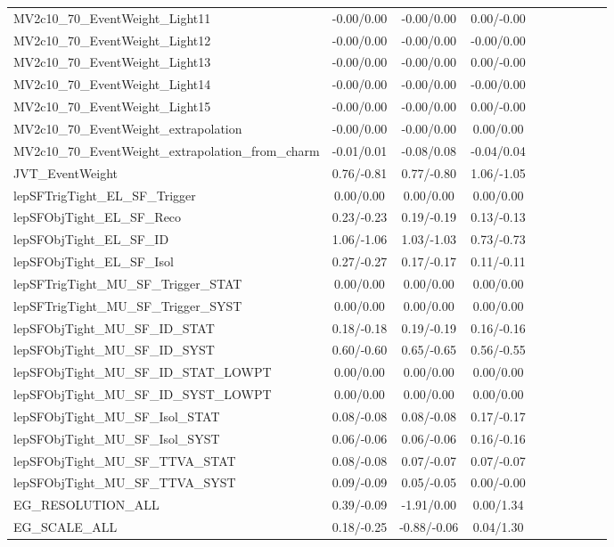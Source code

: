 \begin{table}[h]
\begin{center}
\begin{tabular}{l|ccccccccc}
MV2c10\_70\_EventWeight\_Light11 &-0.00/0.00 &-0.00/0.00 &0.00/-0.00 \\
MV2c10\_70\_EventWeight\_Light12 &-0.00/0.00 &-0.00/0.00 &-0.00/0.00 \\
MV2c10\_70\_EventWeight\_Light13 &-0.00/0.00 &-0.00/0.00 &0.00/-0.00 \\
MV2c10\_70\_EventWeight\_Light14 &-0.00/0.00 &-0.00/0.00 &-0.00/0.00 \\
MV2c10\_70\_EventWeight\_Light15 &-0.00/0.00 &-0.00/0.00 &0.00/-0.00 \\
MV2c10\_70\_EventWeight\_extrapolation &-0.00/0.00 &-0.00/0.00 &0.00/0.00 \\
MV2c10\_70\_EventWeight\_extrapolation\_from\_charm &-0.01/0.01 &-0.08/0.08 &-0.04/0.04 \\
JVT\_EventWeight &0.76/-0.81 &0.77/-0.80 &1.06/-1.05 \\
lepSFTrigTight\_EL\_SF\_Trigger &0.00/0.00 &0.00/0.00 &0.00/0.00 \\
lepSFObjTight\_EL\_SF\_Reco &0.23/-0.23 &0.19/-0.19 &0.13/-0.13 \\
lepSFObjTight\_EL\_SF\_ID &1.06/-1.06 &1.03/-1.03 &0.73/-0.73 \\
lepSFObjTight\_EL\_SF\_Isol &0.27/-0.27 &0.17/-0.17 &0.11/-0.11 \\
lepSFTrigTight\_MU\_SF\_Trigger\_STAT &0.00/0.00 &0.00/0.00 &0.00/0.00 \\
lepSFTrigTight\_MU\_SF\_Trigger\_SYST &0.00/0.00 &0.00/0.00 &0.00/0.00 \\
lepSFObjTight\_MU\_SF\_ID\_STAT &0.18/-0.18 &0.19/-0.19 &0.16/-0.16 \\
lepSFObjTight\_MU\_SF\_ID\_SYST &0.60/-0.60 &0.65/-0.65 &0.56/-0.55 \\
lepSFObjTight\_MU\_SF\_ID\_STAT\_LOWPT &0.00/0.00 &0.00/0.00 &0.00/0.00 \\
lepSFObjTight\_MU\_SF\_ID\_SYST\_LOWPT &0.00/0.00 &0.00/0.00 &0.00/0.00 \\
lepSFObjTight\_MU\_SF\_Isol\_STAT &0.08/-0.08 &0.08/-0.08 &0.17/-0.17 \\
lepSFObjTight\_MU\_SF\_Isol\_SYST &0.06/-0.06 &0.06/-0.06 &0.16/-0.16 \\
lepSFObjTight\_MU\_SF\_TTVA\_STAT &0.08/-0.08 &0.07/-0.07 &0.07/-0.07 \\
lepSFObjTight\_MU\_SF\_TTVA\_SYST &0.09/-0.09 &0.05/-0.05 &0.00/-0.00 \\
EG\_RESOLUTION\_ALL &0.39/-0.09 &-1.91/0.00 &0.00/1.34 \\
EG\_SCALE\_ALL &0.18/-0.25 &-0.88/-0.06 &0.04/1.30 \\

\end{tabular}
\end{center}
\end{table}
